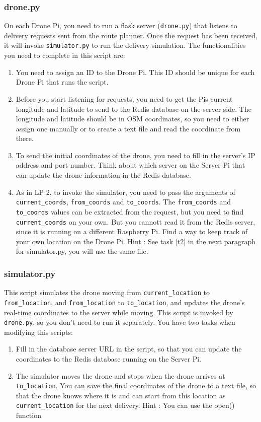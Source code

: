 \documentclass{article}
\begin{document}
\subsubsection{drone.py}
On each Drone Pi, you need to run a flask server (\verb!drone.py!) that listens to delivery requests sent from the route planner. Once the request has been received, it will invoke \verb!simulator.py! to run the delivery simulation. The functionalities you need to complete in this script are:
\begin{enumerate}
    \item You need to assign an ID to the Drone Pi. This ID should be unique for each Drone Pi that runs the script.
    \item Before you start listening for requests, you need to get the Pis current longitude and latitude to send to the Redis database on the server side. The longitude and latitude should be in OSM\cite{OSM} coordinates, so you need to either assign one manually or to create a text file and read the coordinate from there.
    \item To send the initial coordinates of the drone, you need to fill in the server's IP address and port number. Think about which server on the Server Pi that can update the drone information in the Redis database.
    \item As in LP 2, to invoke the simulator, you need to pass the arguments of \verb!current_coords!, \verb!from_coords! and \verb!to_coords!. The \verb!from_coords! and \verb!to_coords! values can be extracted from the request, but you need to find \verb!current_coords! on your own. But you cannott read it from the Redis server, since it is running on a different Raspberry Pi. Find a way to keep track of your own location on the Drone Pi. Hint : See task \ref{t2} in the next paragraph for simulator.py, you will use the same file.
\end{enumerate}

\subsubsection{simulator.py}
This script simulates the drone moving from \verb!current_location! to \verb!from_location!, and \verb!from_location! to \verb!to_location!, and updates the drone's real-time coordinates to the server while moving. This script is invoked by \verb!drone.py!, so you don't need to run it separately. You have two tasks when modifying this scripts:
\begin{enumerate}
    \item Fill in the database server URL in the script, so that you can update the coordinates to the Redis database running on the Server Pi.
    \item\label{t2} The simulator moves the drone and stops when the drone arrives at \verb!to_location!. You can save the final coordinates of the drone to a text file, so that the drone knows where it is and can start from this location as \verb!current_location! for the next delivery. Hint : You can use the open() function \cite{open}
\end{enumerate}
\end{document}
